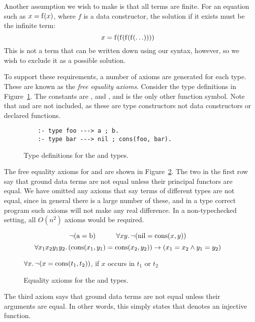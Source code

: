 Another assumption we wish to make is that all terms are finite.
For an equation such as $x = \operatorname{f}(x)$,
where $f$ is a data constructor,
the solution if it exists must be the infinite term:
\[ x = \operatorname{f}(\operatorname{f}(\operatorname{f}(\operatorname{f}(\ldots)))) \]
This is not a term that can be written down using our syntax, however,
so we wish to exclude it as a possible solution.

To support these requirements,
a number of axioms are generated for each type.
These are known as the \emph{free equality axioms}.
Consider the type definitions in Figure~\ref{fig:decl-foobar}.
The constants are ,  and ,
and  is the only other function symbol.
Note that  and  are not included,
as these are type constructors not data constructors
or declared functions.

\begin{figure}
\begin{verbatim}
    :- type foo ---> a ; b.
    :- type bar ---> nil ; cons(foo, bar).
\end{verbatim}
\caption{Type definitions for the  and  types.
\label{fig:decl-foobar}}
\end{figure}

The free equality axioms for  and 
are shown in Figure~\ref{fig:ax-foobar}.
The two in the first row say that
ground data terms are not equal
unless their principal functors are equal.
We have omitted any axioms that say
terms of different types are not equal,
since in general there is a large number of these,
and in a type correct program
such axioms will not make any real difference.
In a non-typechecked setting,
all $O(n^2)$ axioms would be required.

\begin{figure}
\[
    \lnot (\operatorname{a} = \operatorname{b})
    \qquad\quad
    \forall x y.\, \lnot (\operatorname{nil} = \operatorname{cons}(x, y))
\]
\[
    \forall x_1 x_2 y_1 y_2.\,
    (\operatorname{cons}(x_1, y_1) = \operatorname{cons}(x_2, y_2))
    \rightarrow
    (x_1 = x_2 \land y_1 = y_2)
\]
\begin{center}
$\forall x.\, \lnot (x = \operatorname{cons}(t_1, t_2))$,
if $x$ occurs in $t_1$ or $t_2$
\end{center}
\caption{Equality axioms for the  and  types.
\label{fig:ax-foobar}}
\end{figure}

The third axiom says that
ground data terms are not equal
unless their arguments are equal.
In other words,
this simply states that
 denotes an injective function.

